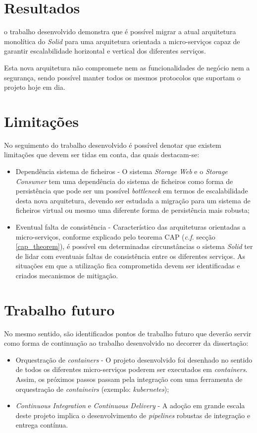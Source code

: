 \section{Resultados}
o trabalho desenvolvido demonstra que é possível migrar a atual arquitetura monolítica do \emph{Solid} para uma arquitetura orientada a micro-serviços capaz de garantir escalabilidade horizontal e vertical dos diferentes serviços.

Esta nova arquitetura não compromete nem as funcionalidades de negócio nem a segurança, sendo possível manter todos os mesmos protocolos que suportam o projeto hoje em dia.

\section{Limitações}

No seguimento do trabalho desenvolvido é possível denotar que existem limitações que devem ser tidas em conta, das quais destacam-se:

\begin{itemize}
    \item Dependência sistema de ficheiros - O sistema \emph{Storage Web} e o \emph{Storage Consumer} tem uma dependência do sistema de ficheiros como forma de persistência que pode ser um possível \emph{bottleneck} em termos de escalabilidade desta nova arquitetura, devendo ser estudada a migração para um sistema de ficheiros virtual ou mesmo uma diferente forma de persistência mais robusta;
    \item Eventual falta de consistência - Característico das arquiteturas orientadas a micro-serviços, conforme explicado pelo teorema \acrshort{CAP} (\emph{c.f.} secção \ref{cap_theorem}), é possível em determinadas circunstâncias o sistema \emph{Solid} ter de lidar com eventuais faltas de consistência entre os diferentes serviços. As situações em que a utilização fica comprometida devem ser identificadas e criados mecanismos de mitigação.
\end{itemize}

\section{Trabalho futuro}
No mesmo sentido, são identificados pontos de trabalho futuro que deverão servir como forma de continuação ao trabalho desenvolvido no decorrer da dissertação:

\begin{itemize}
    \item Orquestração de \emph{containers} - O projeto desenvolvido foi desenhado no sentido de todos os diferentes micro-serviços poderem ser executados em \emph{containers}. Assim, os próximos passos passam pela integração com uma ferramenta de orquestração de \emph{containeirs} (exemplo: \emph{kubernetes});
    \item \emph{Continuous Integration} e \emph{Continuous Delivery} - A adoção em grande escala deste projeto implica o desenvolvimento de \emph{pipelines} robustas de integração e entrega contínua.
\end{itemize}

